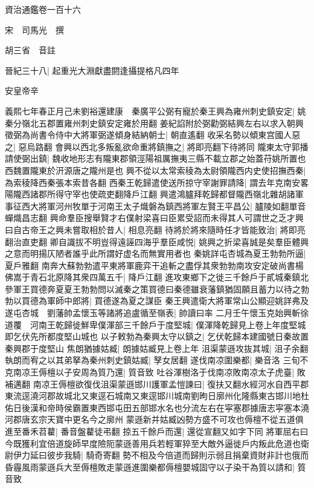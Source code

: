 資治通鑑卷一百十六


宋　司馬光　撰

胡三省　音註

晉紀三十八|{
	起重光大淵獻盡閼逢攝提格凡四年}


安皇帝辛

義熙七年春正月己未劉裕還建康　秦廣平公弼有寵於秦王興為雍州刺史鎮安定|{
	姚秦分嶺北五郡置雍州刺史鎮安定雍於用翻}
姜紀諂附於弼勸弼結興左右以求入朝興徵弼為尚書令侍中大將軍弼遂傾身結納朝士|{
	朝直遙翻}
收采名勢以傾東宫國人惡之|{
	惡烏路翻}
會興以西北多叛亂欲命重將鎮撫之|{
	將即亮翻下待將同}
隴東太守郭播請使弼出鎮|{
	魏收地形志有隴東郡領涇陽祖厲撫夷三縣不載立郡之始蓋苻姚所置也西魏置隴東於汧源唐之隴州是也}
興不從以太常索稜為太尉領隴西内史使招撫西秦|{
	為索稜降西秦張本索昔各翻}
西秦王乾歸遣使送所掠守宰謝罪請降|{
	謂去年克南安畧陽隴西諸郡所得守宰也使疏吏翻降戶江翻}
興遣鴻臚拜乾歸都督隴西嶺北雜胡諸軍事征西大將軍河州牧單于河南王太子熾磐為鎮西將軍左賢王平昌公|{
	臚陵如翻單音蟬熾昌志翻}
興命羣臣搜舉賢才右僕射梁喜曰臣累受詔而未得其人可謂世之乏才興曰自古帝王之興未嘗取相於昔人|{
	相息亮翻}
待將於將來隨時任才皆能致治|{
	將即亮翻治直吏翻}
卿自識拔不明豈得遠誣四海乎羣臣咸悦|{
	姚興之折梁喜誠是矣羣臣體興之意而明揚仄陋者誰乎此所謂好虚名而無實用者也}
秦姚詳屯杏城為夏王勃勃所逼|{
	夏戶雅翻}
南奔大蘇勃勃遣平東將軍鹿弈干追斬之盡俘其衆勃勃南攻安定破尚書楊佛嵩于青石北原降其衆四萬五千|{
	降戶江翻}
進攻東鄉下之徙三千餘戶于貳城秦鎮北參軍王買德奔夏夏王勃勃問以滅秦之策買德曰秦德雖衰藩鎮猶固願且蓄力以待之勃勃以買德為軍師中郎將|{
	買德遂為夏之謀臣}
秦王興遣衛大將軍常山公顯迎姚詳弗及遂屯杏城　劉藩帥孟懷玉等諸將追盧循至嶺表|{
	帥讀曰率}
二月壬午懷玉克始興斬徐道覆　河南王乾歸徙鮮卑僕渾部三千餘戶于度堅城|{
	僕渾降乾歸見上卷上年度堅城即乞伏先所都度堅山城也}
以子敕勃為秦興太守以鎮之|{
	乞伏乾歸本建國號日秦故置秦興郡于度堅山}
焦朗猶據姑臧|{
	朗據姑臧見上卷上年}
沮渠蒙遜攻抜其城|{
	沮子余翻}
執朗而宥之以其弟拏為秦州刺史鎮姑臧|{
	孥女居翻}
遂伐南凉圍樂都|{
	樂音洛}
三旬不克南凉王傉檀以子安周為質乃還|{
	質音致}
吐谷渾樹洛于伐南凉敗南凉太子虎臺|{
	敗補邁翻}
南凉王傉檀欲復伐沮渠蒙遜邯川護軍孟愷諫曰|{
	復扶又翻水經河水自西平郡東流逕澆河郡故城北又東逕石城南又東逕邯川城南劉昫日廓州化隆縣東古邯川地杜佑日後漢和帝時侯霸置東西邯屯田五部邯水名也分流左右在寜塞郡據唐志寜塞本澆河郡唐玄宗天寶中更名今之廓州}
蒙遜新并姑臧凶勢方盛不可攻也傉檀不從五道俱進至番禾苕藋|{
	番音盤藋徒弔翻}
掠五千餘戶而還|{
	還從宣翻又如字下同}
將軍屈右曰今既獲利宜倍道旋師早度險阨蒙遜善用兵若輕軍猝至大敵外逼徙戶内叛此危道也衛尉伊力延曰彼步我騎|{
	騎奇寄翻}
勢不相及今倍道而歸則示弱且捐棄資財非計也俄而昏霾風雨蒙遜兵大至傉檀敗走蒙遜進圍樂都傉檀嬰城固守以子染干為質以請和|{
	質音致}
